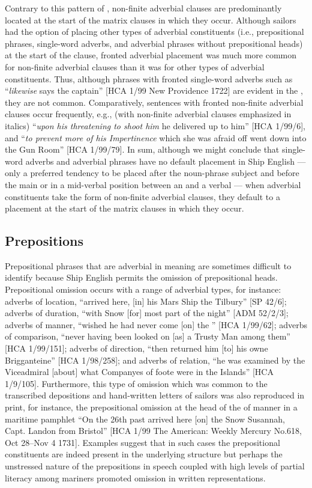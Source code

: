 Contrary to this pattern of , non-finite adverbial clauses are predominantly located at the start of the matrix clauses in which they occur. Although sailors had the option of placing other types of adverbial constituents (i.e., prepositional phrases, single-word adverbs, and adverbial phrases without prepositional heads) at the start of the clause, fronted adverbial placement was much more common for non-finite adverbial clauses than it was for other types of adverbial constituents. Thus, although phrases with fronted single-word adverbs such as “\textit{likewise} says the captain” [HCA 1/99 New Providence 1722] are evident in the , they are not common. Comparatively, sentences with fronted non-finite adverbial clauses occur frequently, e.g., (with non-finite adverbial clauses emphasized in italics) “\textit{upon his threatening to shoot him} he delivered up to him” [HCA 1/99/6], and “\textit{to prevent more of his Impertinence} which she was afraid off went down into the Gun Room” [HCA 1/99/79]. In sum, although we might conclude that single-word adverbs and adverbial phrases have no default placement in Ship English — only a preferred tendency to be placed after the noun-phrase subject and before the main  or in a mid-verbal position between an  and a verbal  — when adverbial constituents take the form of non-finite adverbial clauses, they default to a placement at the start of the matrix clauses in which they occur. 

\subsection{{Prepositions} }%

Prepositional phrases that are adverbial in meaning are sometimes difficult to identify because Ship English permits the omission of prepositional heads. Prepositional omission occurs with a range of adverbial types, for instance: adverbs of location, “arrived here, [in] his Mars Ship the Tilbury” [SP 42/6]; adverbs of duration, “with Snow [for] most part of the night” [ADM 52/2/3]; adverbs of manner, “wished he had never come [on] the ” [HCA 1/99/62]; adverbs of comparison, “never having been looked on [as] a Trusty Man among them” [HCA 1/99/151]; adverbs of direction, “then returned him [to] his owne Brigganteine” [HCA 1/98/258]; and adverbs of relation, “he was examined by the Viceadmiral [about] what Companyes of foote were in the Islands” [HCA 1/9/105]. Furthermore, this type of omission which was common to the transcribed depositions and hand-written letters of sailors was also reproduced in print, for instance, the prepositional omission at the head of the  of manner in a maritime pamphlet “On the 26th past arrived here [on] the Snow Susannah, Capt. Landon from Bristol” [HCA 1/99 The American: Weekly Mercury No.618, Oct 28–Nov 4 1731]. Examples suggest that in such cases the prepositional constituents are indeed present in the underlying structure but perhaps the unstressed nature of the prepositions in speech coupled with high levels of partial literacy among mariners promoted omission in written representations. 

